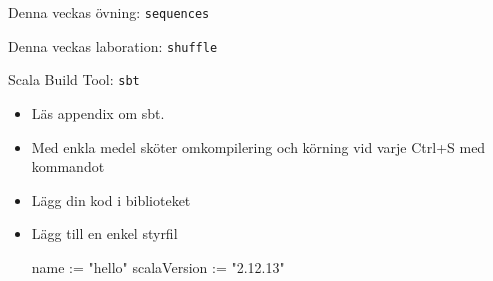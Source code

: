 
\ifkompendium\else


\begin{Slide}{Denna veckas övning: \texttt{sequences}}
\begin{itemize}\SlideFontTiny

\end{itemize}
\end{Slide}

\begin{Slide}{Denna veckas laboration: \texttt{shuffle}}
\begin{itemize}\SlideFontSmall

\end{itemize}
\end{Slide}
\fi

\begin{Slide}{Scala Build Tool: \texttt{sbt}}
\begin{itemize}
\item Läs appendix om sbt.
\item Med enkla medel sköter  omkompilering och körning vid varje Ctrl+S med kommandot  
\item Lägg din kod i biblioteket 
\item Lägg till en enkel styrfil 
\begin{Code}
name := "hello"
scalaVersion := "2.12.13" 
\end{Code}
\end{itemize}
\end{Slide}
